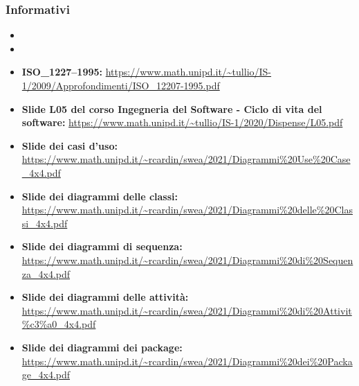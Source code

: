\subsubsection{Informativi}
\begin{itemize}
	\item \PdPv{}
	\item \PdQv{}
	\item \textbf{ISO\_1227--1995:} \url{https://www.math.unipd.it/~tullio/IS-1/2009/Approfondimenti/ISO_12207-1995.pdf}
	\item \textbf{Slide L05 del corso Ingegneria del Software - Ciclo di vita del software:} \url{https://www.math.unipd.it/~tullio/IS-1/2020/Dispense/L05.pdf}
	\item \textbf{Slide dei casi d'uso:} \url{https://www.math.unipd.it/~rcardin/swea/2021/Diagrammi%20Use%20Case_4x4.pdf}
	\item \textbf{Slide dei diagrammi delle classi:} \url{https://www.math.unipd.it/~rcardin/swea/2021/Diagrammi%20delle%20Classi_4x4.pdf}
	\item \textbf{Slide dei diagrammi di sequenza:} \url{https://www.math.unipd.it/~rcardin/swea/2021/Diagrammi%20di%20Sequenza_4x4.pdf}
	\item \textbf{Slide dei diagrammi delle attività:} \url{https://www.math.unipd.it/~rcardin/swea/2021/Diagrammi%20di%20Attivit%c3%a0_4x4.pdf}
	\item \textbf{Slide dei diagrammi dei package:} \url{https://www.math.unipd.it/~rcardin/swea/2021/Diagrammi%20dei%20Package_4x4.pdf}
	
\end{itemize}